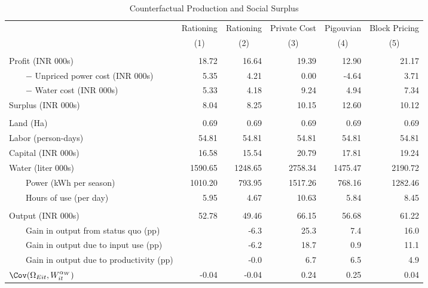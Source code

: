 \begin{table}[!ht]
	\centering
		\caption{Counterfactual Production and Social Surplus\label{tab:cfOutcomes}}
\begin{tabular}{lrrrrr}
		\toprule
               &Rationing&Rationing&Private Cost&Pigouvian&Block Pricing\\
&\multicolumn{1}{c}{(1)}&\multicolumn{1}{c}{(2)}&\multicolumn{1}{c}{(3)}&\multicolumn{1}{c}{(4)}&\multicolumn{1}{c}{(5)}\\
		\midrule
		 \addlinespace 
\multicolumn{6}{c}{\emph{A. Profits and social surplus}}\\
		 \addlinespace 
		Profit (INR 000s)&18.72&16.64&19.39&12.90&21.17\\
		~~~~$-$ Unpriced power cost (INR 000s)&5.35&4.21&0.00&-4.64&3.71\\
		~~~~$-$ Water cost (INR 000s)&5.33&4.18&9.24&4.94&7.34\\
\cmidrule(lr){1-1}		Surplus (INR 000s)&8.04&8.25&10.15&12.60&10.12\\
		 \addlinespace 
\multicolumn{6}{c}{\emph{B. Input use}}\\
		 \addlinespace 
		      Land (Ha)&0.69&0.69&0.69&0.69&0.69\\
		Labor (person-days)&54.81&54.81&54.81&54.81&54.81\\
		Capital (INR 000s)&16.58&15.54&20.79&17.81&19.24\\
		Water (liter 000s)&1590.65&1248.65&2758.34&1475.47&2190.72\\
		~~~~Power (kWh per season)&1010.20&793.95&1517.26&768.16&1282.46\\
		~~~~Hours of use (per day)&5.95&4.67&10.63&5.84&8.45\\
		 \addlinespace 
\multicolumn{6}{c}{\emph{C. Output and productivity}}\\
		 \addlinespace 
		Output (INR 000s)&52.78&49.46&66.15&56.68&61.22\\
		~~~~Gain in output from status quo (pp)&&-6.3&25.3& 7.4&16.0\\
		~~~~Gain in output due to input use (pp)&&-6.2&18.7& 0.9&11.1\\
		~~~~Gain in output due to productivity (pp)&&-0.0& 6.7& 6.5& 4.9\\
		$\Cov(\Omega_{Eit},W_{it}^{\alpha_W})$&-0.04&-0.04&0.24&0.25&0.04\\
		\bottomrule

\end{tabular}
\end{table}
